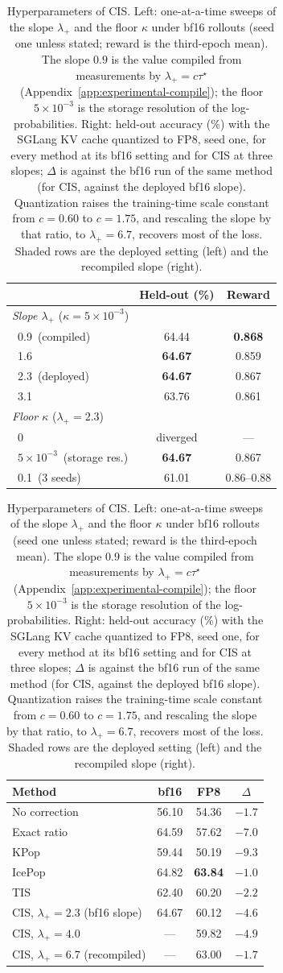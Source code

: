 \begin{table}[t]
\centering
\caption{Hyperparameters of CIS. Left: one-at-a-time sweeps of the slope $\lambda_+$ and the floor $\kappa$ under bf16 rollouts (seed one unless stated; reward is the third-epoch mean). The slope $0.9$ is the value compiled from measurements by $\lambda_+=c\tau^\star$ (Appendix~\ref{app:experimental-compile}); the floor $5\times10^{-3}$ is the storage resolution of the log-probabilities. Right: held-out accuracy (\%) with the SGLang KV cache quantized to FP8, seed one, for every method at its bf16 setting and for CIS at three slopes; $\Delta$ is against the bf16 run of the same method (for CIS, against the deployed bf16 slope). Quantization raises the training-time scale constant from $c=0.60$ to $c=1.75$, and rescaling the slope by that ratio, to $\lambda_+=6.7$, recovers most of the loss. Shaded rows are the deployed setting (left) and the recompiled slope (right).}
\label{tab:tuning}
\footnotesize\setlength{\tabcolsep}{3pt}
\begin{minipage}[t]{0.5\linewidth}\centering
\begin{tabular}{lcc}
\toprule
 & Held-out (\%) & Reward \\
\midrule
\multicolumn{3}{l}{\emph{Slope $\lambda_+$} ($\kappa=5\times10^{-3}$)} \\
\ 0.9\ (compiled) & 64.44 & \textbf{0.868} \\
\ 1.6 & \textbf{64.67} & 0.859 \\
\rowcolor{blue!8}
\ 2.3\ (deployed) & \textbf{64.67} & 0.867 \\
\ 3.1 & 63.76 & 0.861 \\
\midrule
\multicolumn{3}{l}{\emph{Floor $\kappa$} ($\lambda_+=2.3$)} \\
\ 0 & diverged & --- \\
\rowcolor{blue!8}
\ $5\times10^{-3}$\ (storage res.) & \textbf{64.67} & 0.867 \\
\ 0.1\ (3 seeds) & 61.01 & 0.86--0.88 \\
\bottomrule
\end{tabular}
\end{minipage}\hfill
\begin{minipage}[t]{0.48\linewidth}\centering
\begin{tabular}{lccc}
\toprule
Method & bf16 & FP8 & $\Delta$ \\
\midrule
No correction & 56.10 & 54.36 & $-1.7$ \\
Exact ratio & 64.59 & 57.62 & $-7.0$ \\
KPop & 59.44 & 50.19 & $-9.3$ \\
IcePop & 64.82 & \textbf{63.84} & $-1.0$ \\
TIS & 62.40 & 60.20 & $-2.2$ \\
CIS, $\lambda_+=2.3$ (bf16 slope) & 64.67 & 60.12 & $-4.6$ \\
CIS, $\lambda_+=4.0$ & --- & 59.82 & $-4.9$ \\
\rowcolor{blue!8}
CIS, $\lambda_+=6.7$ (recompiled) & --- & 63.00 & $-1.7$ \\
\bottomrule
\end{tabular}
\end{minipage}
\end{table}

